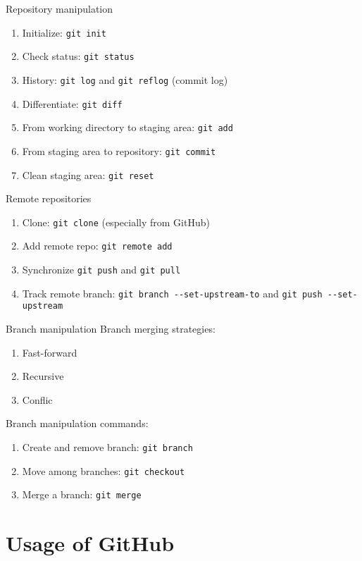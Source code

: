 \documentclass[english, nochinese]{../TeXTemplate/pkuslide}
\begin{document}
\begin{frame}[fragile]{Repository manipulation}
\begin{enumerate}
\item Initialize: \verb"git init"
\item Check status: \verb"git status"
\item History: \verb"git log" and \verb"git reflog" (commit log)
\item Differentiate: \verb"git diff"
\item From working directory to staging area: \verb"git add"
\item From staging area to repository: \verb"git commit"
\item Clean staging area: \verb"git reset"
\end{enumerate}
\end{frame}

\begin{frame}[fragile]{Remote repositories}
\begin{enumerate}
\item Clone: \verb"git clone" (especially from GitHub)
\item Add remote repo: \verb"git remote add"
\item Synchronize \verb"git push" and \verb"git pull"
\item Track remote branch: \verb"git branch --set-upstream-to" and \verb"git push --set-upstream"
\end{enumerate}
\end{frame}

\begin{frame}[fragile]{Branch manipulation}
Branch merging strategies:
\begin{enumerate}
\item Fast-forward
\item Recursive
\item Conflic
\end{enumerate}

Branch manipulation commands:
\begin{enumerate}
\item Create and remove branch: \verb"git branch"
\item Move among branches: \verb"git checkout"
\item Merge a branch: \verb"git merge"
\end{enumerate}
\end{frame}

\section{Usage of GitHub}
\end{document}
